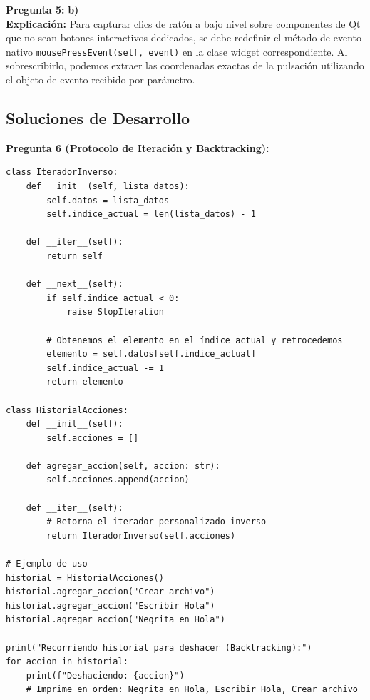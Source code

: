 \documentclass[12pt,letterpaper]{article}
\begin{document}
\medskip

\textbf{Pregunta 5:} \textbf{b)} \\
\textbf{Explicación:} Para capturar clics de ratón a bajo nivel sobre componentes de Qt que no sean botones interactivos dedicados, se debe redefinir el método de evento nativo \texttt{mousePressEvent(self, event)} en la clase widget correspondiente. Al sobrescribirlo, podemos extraer las coordenadas exactas de la pulsación utilizando el objeto de evento recibido por parámetro.

\pagebreak

\subsection*{Soluciones de Desarrollo}

\textbf{Pregunta 6 (Protocolo de Iteración y Backtracking):}
\begin{verbatim}
class IteradorInverso:
    def __init__(self, lista_datos):
        self.datos = lista_datos
        self.indice_actual = len(lista_datos) - 1

    def __iter__(self):
        return self

    def __next__(self):
        if self.indice_actual < 0:
            raise StopIteration
        
        # Obtenemos el elemento en el índice actual y retrocedemos
        elemento = self.datos[self.indice_actual]
        self.indice_actual -= 1
        return elemento

class HistorialAcciones:
    def __init__(self):
        self.acciones = []

    def agregar_accion(self, accion: str):
        self.acciones.append(accion)

    def __iter__(self):
        # Retorna el iterador personalizado inverso
        return IteradorInverso(self.acciones)

# Ejemplo de uso
historial = HistorialAcciones()
historial.agregar_accion("Crear archivo")
historial.agregar_accion("Escribir Hola")
historial.agregar_accion("Negrita en Hola")

print("Recorriendo historial para deshacer (Backtracking):")
for accion in historial:
    print(f"Deshaciendo: {accion}")
    # Imprime en orden: Negrita en Hola, Escribir Hola, Crear archivo
\end{verbatim}

\pagebreak
\end{document}
